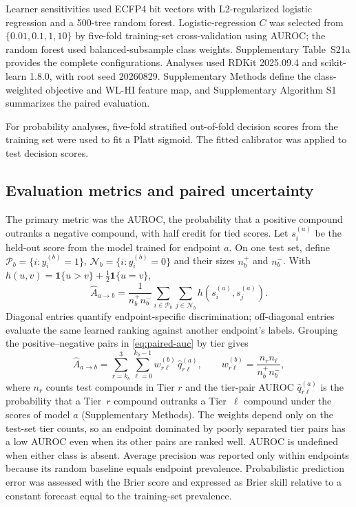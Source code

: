 \documentclass{ieeeaccess}
\begin{document}
Learner sensitivities used ECFP4 bit vectors with L2-regularized logistic regression and a 500-tree random forest. Logistic-regression \(C\) was selected from \(\{0.01,0.1,1,10\}\) by five-fold training-set cross-validation using AUROC; the random forest used balanced-subsample class weights. Supplementary Table~S21a provides the complete configurations. Analyses used RDKit 2025.09.4\cite{RDKit2025_09_4} and scikit-learn 1.8.0\cite{Pedregosa2011}, with root seed 20260829. Supplementary Methods define the class-weighted objective and WL-HI feature map, and Supplementary Algorithm S1 summarizes the paired evaluation.

For probability analyses, five-fold stratified out-of-fold decision scores from the training set were used to fit a Platt sigmoid\cite{Platt1999}. The fitted calibrator was applied to test decision scores.

\subsection{Evaluation metrics and paired uncertainty}
The primary metric was the AUROC, the probability that a positive compound outranks a negative compound, with half credit for tied scores. Let \(s_i^{(a)}\) be the held-out score from the model trained for endpoint \(a\). On one test set, define \(\mathcal P_b=\{i:y_i^{(b)}=1\}\), \(\mathcal N_b=\{i:y_i^{(b)}=0\}\) and their sizes \(n_b^+\) and \(n_b^-\). With \(h(u,v)=\mathbf1\{u>v\}+\tfrac12\mathbf1\{u=v\}\),
\begin{equation}
\widehat A_{a\to b}=\frac{1}{n_b^+n_b^-}
\sum_{i\in\mathcal P_b}\sum_{j\in\mathcal N_b}
h\!\left(s_i^{(a)},s_j^{(a)}\right).
\label{eq:paired-auc}
\end{equation}
Diagonal entries quantify endpoint-specific discrimination; off-diagonal entries evaluate the same learned ranking against another endpoint's labels. Grouping the positive--negative pairs in \eqref{eq:paired-auc} by tier gives
\begin{equation}
\widehat A_{a\to b}=\sum_{r=k_b}^{3}\sum_{\ell=0}^{k_b-1}
w_{r\ell}^{(b)}\,\widehat q_{r\ell}^{(a)},\qquad
w_{r\ell}^{(b)}=\frac{n_rn_\ell}{n_b^+n_b^-},
\label{eq:tier-pair}
\end{equation}
where \(n_r\) counts test compounds in Tier \(r\) and the tier-pair AUROC \(\widehat q_{r\ell}^{(a)}\) is the probability that a Tier~\(r\) compound outranks a Tier~\(\ell\) compound under the scores of model \(a\) (Supplementary Methods). The weights depend only on the test-set tier counts, so an endpoint dominated by poorly separated tier pairs has a low AUROC even when its other pairs are ranked well. AUROC is undefined when either class is absent. Average precision was reported only within endpoints because its random baseline equals endpoint prevalence. Probabilistic prediction error was assessed with the Brier score\cite{Brier1950} and expressed as Brier skill relative to a constant forecast equal to the training-set prevalence.
\end{document}

